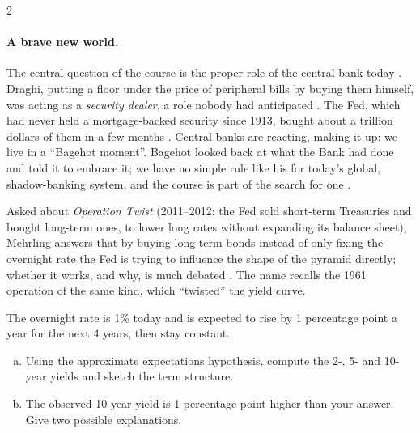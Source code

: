 \begin{paracol}{2}
\paragraph{A brave new world.} The central question of the course is the proper role of the central bank today
. Draghi, putting a floor under the price of peripheral bills by buying them himself, was acting as a
\emph{security dealer}, a role nobody had anticipated . The Fed, which had never held a
mortgage-backed security since 1913, bought about a trillion dollars of them in a few months
. Central banks are reacting, making it up: we live in a ``Bagehot moment''. Bagehot looked
back at what the Bank had done and told it to embrace it; we have no simple rule like his for today's global, shadow-banking
system, and the course is part of the search for one .

\begin{finance}
Asked about \emph{Operation Twist} (2011--2012: the Fed sold short-term Treasuries and bought long-term ones, to lower
long rates without expanding its balance sheet), Mehrling answers that by buying long-term bonds instead of only fixing the
overnight rate the Fed is trying to influence the shape of the pyramid directly; whether it works, and why, is much debated
. The name recalls the 1961 operation of the same kind, which ``twisted'' the yield curve.
\end{finance}

\begin{exercise}
The overnight rate is 1\% today and is expected to rise by 1 percentage point a year for the next 4 years, then stay
constant.
\begin{enumerate}[(a)]
  \item Using the approximate expectations hypothesis, compute the 2-, 5- and 10-year yields and sketch the term
        structure.
  \item The observed 10-year yield is 1 percentage point higher than your answer. Give two possible explanations.
\end{enumerate}
\end{exercise}


\end{paracol}
